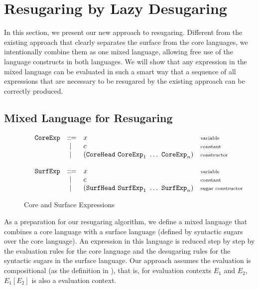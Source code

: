 
\section{Resugaring by Lazy Desugaring}
\label{sec3}

In this section, we present our new approach to resugaring. Different from the existing approach that clearly separates the surface from the core languages, we intentionally combine them as one mixed language, allowing free use of the language constructs in both languages. We will show that any expression in the mixed language can be evaluated in such a smart way that a sequence of all expressions that are necessary to be resugared by the existing approach can be correctly produced.

\subsection{Mixed Language for Resugaring}

\begin{figure}[t]
\begin{flushleft}
{\footnotesize
\[
\begin{array}{lllll}
 &\mbox{\tt CoreExp} &::=& x  & \mbox{{\scriptsize variable}}\\
       &&~|~& c  & \mbox{{\scriptsize constant}}\\
			 &&~|~& (\mbox{\tt CoreHead}~\mbox{\tt CoreExp}_1~\ldots~\mbox{\tt CoreExp}_n) & \mbox{{\scriptsize constructor}}\\
\\
 &\mbox{\tt SurfExp} &::=& x  & \mbox{{\scriptsize variable}}\\
       &&~|~& c  & \mbox{{\scriptsize constant}}\\
				 &&~|~& (\mbox{\tt SurfHead}~\mbox{\tt SurfExp}_1~\ldots~\mbox{\tt SurfExp}_n) & \mbox{{\scriptsize sugar constructor}}\\
\end{array}
\]
}
\end{flushleft}


	\caption{Core and Surface Expressions \todo{}}
	\label{fig:expression}
\end{figure}

As a preparation for our resugaring algorithm, we define a mixed language that combines a core language with a surface language (defined by syntactic sugars over the core language). An expression in this language is reduced step by step by the evaluation rules for the core language and the desugaring rules for the syntactic sugars in the surface language. Our approach assumes the evaluation is  compositional (as the definition in \cite{hygienic}), that is, for evaluation contexts $E_1$ and $E_2$, $E_1[E_2]$ is also a evaluation context.
